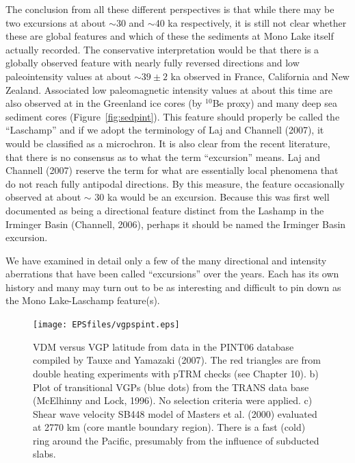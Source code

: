 The conclusion from all these different perspectives is that while there may be two excursions at about $\sim$30 and $\sim$40 ka respectively, it is still not clear whether these are global features and which of these the sediments at Mono Lake itself actually recorded.   The conservative interpretation would be  that there is a globally observed  feature with nearly fully reversed directions and low paleointensity values at about $\sim 39 \pm 2$ ka observed in France, California and New Zealand.  Associated low paleomagnetic intensity values at about this time are also observed at in the Greenland ice cores (by $^{10}$Be proxy) and many deep sea sediment cores (Figure~\ref{fig:sedpint}).    This feature should properly be called the ``Laschamp'' and if we adopt the terminology of 
Laj and Channell (2007), it would be classified as a microchron.   
It is also clear from the recent literature, that there is no consensus as to what the term  ``excursion'' means.  Laj and Channell (2007) reserve the term for what are essentially local phenomena that do not reach fully antipodal directions.  By this measure,  the feature occasionally observed at about $\sim$ 30 ka would be an excursion.  Because this was first well documented as being a directional feature distinct from the Lashamp in the Irminger Basin (Channell, 2006), perhaps it should be named the Irminger Basin excursion.     



We have examined in detail only a few of the many directional and intensity aberrations that have been called ``excursions'' over the years.   Each has its own history and many may turn out to be as interesting and difficult to pin down as the Mono Lake-Laschamp feature(s).     

\begin{figure}[htb]
\centering  \texttt{[image: EPSfiles/vgpspint.eps]}
\caption{ VDM versus VGP latitude from data in the PINT06 database compiled by Tauxe and Yamazaki (2007).  The red triangles are from double heating  experiments with pTRM checks (see Chapter 10).  b) Plot of transitional VGPs (blue dots) from the TRANS data base (McElhinny and Lock, 1996). No selection criteria were applied.  c) Shear wave velocity SB448 model of Masters et al. (2000) evaluated at 2770 km (core mantle boundary region).  There is a fast (cold) ring around the Pacific, presumably from the influence of subducted slabs.   }
\label{fig:vgpspint}
\end{figure}
\nocite{tauxe07,mcelhinny96,masters00}


